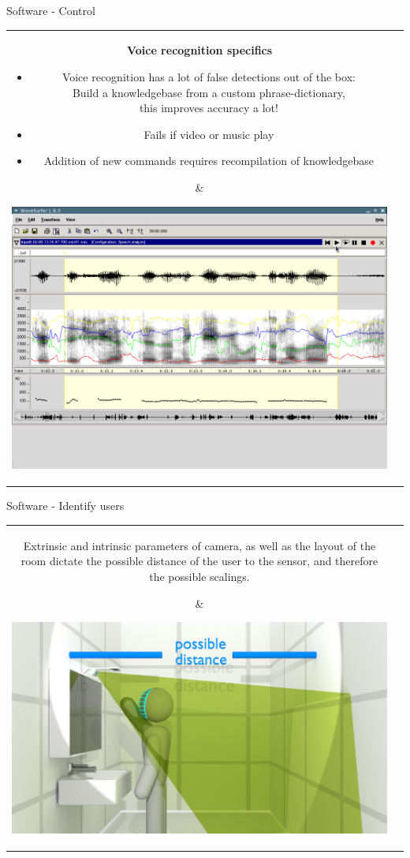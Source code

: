 \documentclass[xcolor=svgnames,handout,aspectratio=169]{beamer}
\begin{document}
\begin{frame}
	{Software - Control}

	\begin{tabular}{cl}  
			\parbox{0.7\linewidth}{
				\textbf{Voice recognition specifics}
				\begin{itemize}
					\item Voice recognition has a lot of false detections out of the box:\\
						Build a knowledgebase from a custom phrase-dictionary,\\
						this improves accuracy a lot!
					\item Fails if video or music play
					\item Addition of new commands requires recompilation of knowledgebase
				\end{itemize}
			}&
			\parbox{0.25\linewidth}{			
				\includegraphics[width=\linewidth]{images/waveform}
			}
		\end{tabular}
\end{frame}


\begin{frame}
	{Software - Identify users}
	
		\begin{tabular}{cl}  
			\parbox{0.35\linewidth}{
				Extrinsic and intrinsic parameters of camera,
				as well as the layout of the room dictate
				the possible distance of the user to the sensor,
				and therefore the possible scalings.
			}&
			\parbox{0.6\linewidth}{			
				\includegraphics[width=\linewidth]{images/mirror_distance}
			}
		\end{tabular}

\end{frame}
\end{document}
